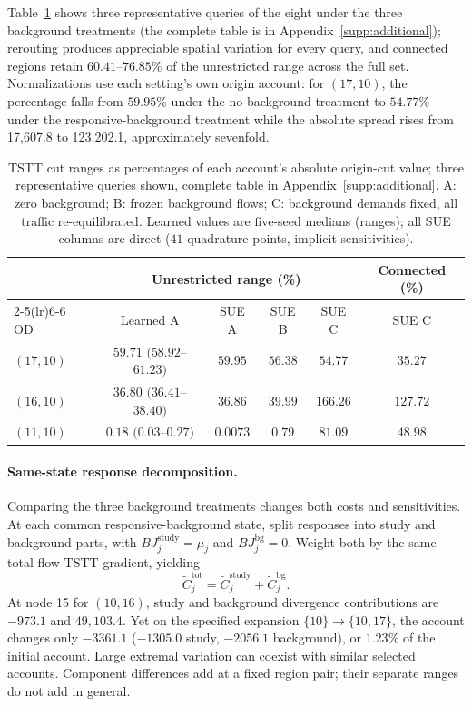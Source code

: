 Table~\ref{tab:cutspreadperod} shows three representative queries of the eight under the three background treatments (the complete table is in Appendix~\ref{supp:additional}); rerouting produces appreciable spatial variation for every query, and connected regions retain $60.41$--$76.85\%$ of the unrestricted range across the full set. Normalizations use each setting's own origin account: for $(17,10)$, the percentage falls from $59.95\%$ under the no-background treatment to $54.77\%$ under the responsive-background treatment while the absolute spread rises from 17,607.8 to 123,202.1, approximately sevenfold.
\begin{table}[pos=htbp]
\footnotesize
\caption{TSTT cut ranges as percentages of each account's absolute
origin-cut value; three representative queries shown, complete table in
Appendix~\ref{supp:additional}. A: zero background; B: frozen background
flows; C: background demands fixed, all traffic re-equilibrated. Learned
values are five-seed medians (ranges); all SUE columns are direct
($41$ quadrature points, implicit sensitivities).}\label{tab:cutspreadperod}
\small
\begin{tabular*}{\tblwidth}{@{\extracolsep{\fill}}lccccc}
\toprule
& \multicolumn{4}{c}{Unrestricted range (\%)} & Connected (\%)\\
\cmidrule(lr){2-5}\cmidrule(lr){6-6}
OD & Learned A & SUE A & SUE B & SUE C & SUE C\\
\midrule
$(17,10)$ & $59.71$ $(58.92$--$61.23)$ & $59.95$ & $56.38$ & $54.77$ & $35.27$ \\
$(16,10)$ & $36.80$ $(36.41$--$38.40)$ & $36.86$ & $39.99$ & $166.26$ & $127.72$ \\
$(11,10)$ & $0.18$ $(0.03$--$0.27)$ & $0.0073$ & $0.79$ & $81.09$ & $48.98$ \\
\bottomrule
\end{tabular*}
\end{table}
\paragraph{Same-state response decomposition.}\label{subsec:bgsplit}
Comparing the three background treatments changes both costs and sensitivities. At each common responsive-background state, split responses into study and background parts, with $BJ_j^{\mathrm{study}}=\mu_j$ and $BJ_j^{\mathrm{bg}}=0$. Weight both by the same total-flow TSTT gradient, yielding
\begin{equation}
\widetilde C_j^{\mathrm{tot}}=\widetilde C_j^{\mathrm{study}}+\widetilde C_j^{\mathrm{bg}}.
\label{eq:bg_attribution}
\end{equation}
At node 15 for $(10,16)$, study and background divergence contributions are $-973.1$ and $49{,}103.4$. Yet on the specified expansion $\{10\}\to\{10,17\}$, the account changes only $-3361.1$ ($-1305.0$ study, $-2056.1$ background), or $1.23\%$ of the initial account. Large extremal variation can coexist with similar selected accounts. Component differences add at a fixed region pair; their separate ranges do not add in general.

